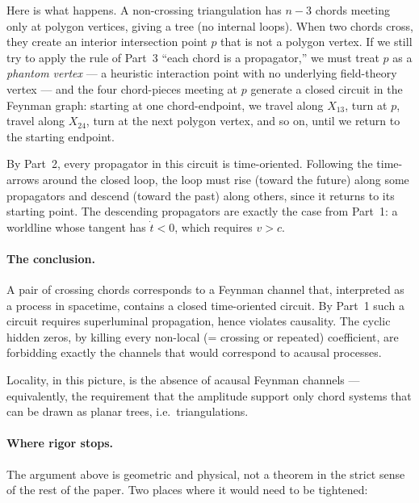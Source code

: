 \documentclass[11pt]{article}
\theoremstyle{definition}
\begin{document}
\noindent
Here is what happens. A non-crossing triangulation has $n-3$ chords meeting only at polygon vertices, giving a tree (no internal loops). When two chords cross, they create an interior intersection point $p$ that is not a polygon vertex. If we still try to apply the rule of Part~3 ``each chord is a propagator,'' we must treat $p$ as a \emph{phantom vertex} --- a heuristic interaction point with no underlying field-theory vertex --- and the four chord-pieces meeting at $p$ generate a closed circuit in the Feynman graph: starting at one chord-endpoint, we travel along $X_{13}$, turn at $p$, travel along $X_{24}$, turn at the next polygon vertex, and so on, until we return to the starting endpoint.

By Part~2, every propagator in this circuit is time-oriented. Following the time-arrows around the closed loop, the loop must rise (toward the future) along some propagators and descend (toward the past) along others, since it returns to its starting point. The descending propagators are exactly the case from Part~1: a worldline whose tangent has $\dot t < 0$, which requires $v > c$.

\paragraph{The conclusion.}
A pair of crossing chords corresponds to a Feynman channel that, interpreted as a process in spacetime, contains a closed time-oriented circuit. By Part~1 such a circuit requires superluminal propagation, hence violates causality. The cyclic hidden zeros, by killing every non-local (= crossing or repeated) coefficient, are forbidding exactly the channels that would correspond to acausal processes.

Locality, in this picture, is the absence of acausal Feynman channels --- equivalently, the requirement that the amplitude support only chord systems that can be drawn as planar trees, i.e.\ triangulations.

\paragraph{Where rigor stops.}
The argument above is geometric and physical, not a theorem in the strict sense of the rest of the paper. Two places where it would need to be tightened:
\end{document}
